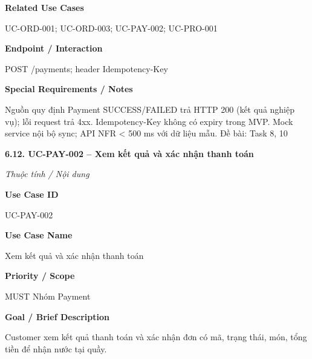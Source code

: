 \documentclass[11pt,a4paper,oneside]{report}
\begin{document}
\par\smallskip\noindent\textcolor{sgublue}{\textbf{Related Use Cases}}\par\nobreak
UC-ORD-001; UC-ORD-003; UC-PAY-002; UC-PRO-001
\par

\par\smallskip\noindent\textcolor{sgublue}{\textbf{Endpoint / Interaction}}\par\nobreak
POST /payments; header Idempotency-Key
\par

\par\smallskip\noindent\textcolor{sgublue}{\textbf{Special Requirements / Notes}}\par\nobreak
Nguồn quy định Payment SUCCESS/FAILED trả HTTP 200 (kết quả nghiệp vụ); lỗi request trả 4xx. Idempotency-Key không có expiry trong MVP. Mock service nội bộ sync; API NFR \textless{} 500 ms với dữ liệu mẫu. \textbar{} Đề bài: Task 8, 10
\par



\textbf{6.12. UC-PAY-002 -- Xem kết quả và xác nhận thanh toán}



\par\noindent\textit{Thuộc tính / Nội dung}\par

\par\smallskip\noindent\textcolor{sgublue}{\textbf{Use Case ID}}\par\nobreak
UC-PAY-002
\par

\par\smallskip\noindent\textcolor{sgublue}{\textbf{Use Case Name}}\par\nobreak
Xem kết quả và xác nhận thanh toán
\par

\par\smallskip\noindent\textcolor{sgublue}{\textbf{Priority / Scope}}\par\nobreak
MUST \textbar{} Nhóm Payment
\par

\par\smallskip\noindent\textcolor{sgublue}{\textbf{Goal / Brief Description}}\par\nobreak
Customer xem kết quả thanh toán và xác nhận đơn có mã, trạng thái, món, tổng tiền để nhận nước tại quầy.
\par
\end{document}
